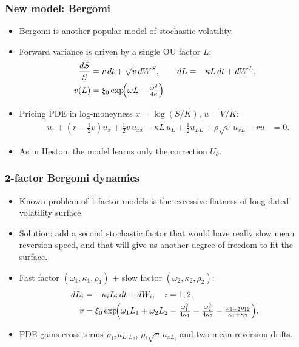 \documentclass{beamer}
\begin{document}
\begin{frame}
\frametitle{New model: Bergomi}
\begin{itemize}
    \item Bergomi is another popular model of stochastic volatility.
    \item Forward variance is driven by a single OU factor $L$:
    \begin{align*}
        \frac{dS}{S} &= r\,dt + \sqrt{v}\,dW^S, \qquad
        dL = -\kappa L\,dt + dW^L, \\
        v(L) &= \xi_0\exp\!\Bigl(\omega L - \tfrac{\omega^2}{4\kappa}\Bigr)
    \end{align*}
    \item Pricing PDE in log-moneyness $x=\log(S/K)$, $u=V/K$:
    \begin{align*}
        -u_\tau + (r-\tfrac12 v)u_x + \tfrac12 v\,u_{xx}
        - \kappa L\,u_L + \tfrac12 u_{LL}
        + \rho\sqrt{v}\,u_{xL} - r u &= 0.
    \end{align*}
    \item As in Heston, the model learns only the correction $U_\theta$.
\end{itemize}
\end{frame}

\begin{frame}
\frametitle{2-factor Bergomi dynamics}
\begin{itemize}
    \item Known problem of 1-factor models is the excessive flatness of long-dated volatility surface.
    \item Solution: add a second stochastic factor that would have really slow mean reversion speed, and that will give us another degree of freedom to fit the surface.
    \item Fast factor $(\omega_1,\kappa_1,\rho_1)$ + slow factor $(\omega_2,\kappa_2,\rho_2)$:
    \begin{align*}
        dL_i &= -\kappa_i L_i\,dt + dW_i,\quad i=1,2, \\
        v &= \xi_0\exp\!\Bigl(
            \omega_1 L_1+\omega_2 L_2
            -\tfrac{\omega_1^2}{4\kappa_1}-\tfrac{\omega_2^2}{4\kappa_2}
            -\tfrac{\omega_1\omega_2\rho_{12}}{\kappa_1+\kappa_2}
        \Bigr).
    \end{align*}
    \item PDE gains cross terms $\rho_{12}u_{L_1L_2}$, $\rho_i\sqrt{v}\,u_{xL_i}$ and two mean-reversion drifts.
\end{itemize}
\end{frame}
\end{document}
